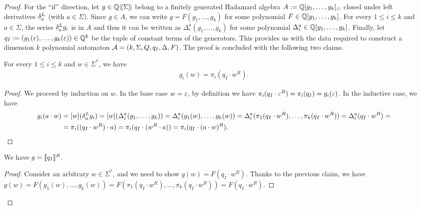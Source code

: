 \begin{proof}
    For the ``if'' direction, let $g \in \mathbb Q\langle\!\langle\Sigma\rangle\!\rangle$
    belong to a finitely generated Hadamard algebra $A := \mathbb Q[g_1, \dots, g_k]_{\operatorname{\odot}}$
    closed under left derivatives $\delta^L_{a}$ (with $a \in \Sigma$).
    Since $g \in A$, we can write $g = F(g_1, \dots, g_k)$
    for some polynomial $F \in \mathbb Q[y_1, \dots, y_k]$.
    For every $1 \leq i \leq k$ and $a \in \Sigma$,
    the series $\delta^L_{a} g_i$ is in $A$ and thus it can be written as
    $\Delta^a_i(g_1, \dots, g_k)$ for some polynomial $\Delta^a_i \in \mathbb Q[y_1, \dots, y_k]$.
    Finally, let $q_I := (g_1(\varepsilon), \dots, g_k(\varepsilon)) \in \mathbb Q^k$ be the tuple of constant terms of the generators.
    This provides us with the data required to construct a dimension $k$ polynomial automaton
    $\mathcal A = (k, \Sigma, Q, q_I, \Delta, F)$.
    The proof is concluded with the following two claims.
    \begin{claim*}
        For every $1 \leq i \leq k$ and $w \in \Sigma^*$, we have
        \begin{align*}
            g_i(w) = \pi_i(q_I \cdot w^R).
        \end{align*}
    \end{claim*}
    \begin{proof}
        We proceed by induction on $w$.
        In the base case $w = \varepsilon$, by definition we have
        $\pi_i(q_I \cdot \varepsilon^R) = \pi_i(q_I) = g_i(\varepsilon)$.
        In the inductive case, we have
        \begin{align*}
            g_i(a \cdot w)
                &=[w](\delta^L_{a} g_i)
                = [w](\Delta^a_i(g_1, \dots, g_k))
                = \Delta^a_i(g_1(w), \dots, g_k(w))
                = \Delta^a_i(\pi_1(q_I \cdot w^R), \dots, \pi_k(q_I \cdot w^R))
                = \Delta^a_i(q_I \cdot w^R) = \\
                &= \pi_i((q_I \cdot w^R) \cdot a)
                = \pi_i(q_I \cdot (w^R \cdot a))
                = \pi_i (q_I \cdot (a \cdot w)^R).
            \qedhere
        \end{align*}
    \end{proof}
    \begin{claim*}
        We have $g = \llbracket q_I\rrbracket^R$.
    \end{claim*}
    \begin{proof}
        Consider an arbitrary $w \in \Sigma^*$,
        and we need to show $g(w) = F(q_I \cdot w^R)$.
        Thanks to the previous claim, we have
        $g(w)
                = F(g_1(w), \dots, g_k(w))
                = F(\pi_1(q_I \cdot w^R), \dots, \pi_k(q_I \cdot w^R))
                = F(q_I \cdot w^R)$.
    \end{proof}
    \qedhere
\end{proof}

